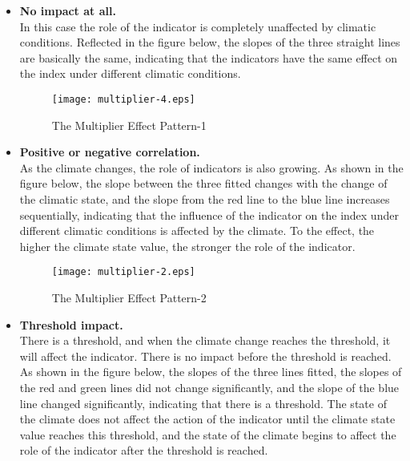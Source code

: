 \documentclass{mcmthesis}
\begin{document}
					\begin{itemize}
						
						\item \textbf{No impact at all.} \\In this case the role of the indicator is completely unaffected by climatic conditions. Reflected in the figure below, the slopes of the three straight lines are basically the same, indicating that the indicators have the same effect on the index under different climatic conditions.
						
						\begin{figure}[h]
							\small
							\centering
							\texttt{[image: multiplier-4.eps]}
							\caption{The Multiplier Effect Pattern-1}
							\label{fig:multiplier-4}
						\end{figure}
						
						\item \textbf{Positive or negative correlation.}\\ As the climate changes, the role of indicators is also growing. As shown in the figure below, the slope between the three fitted changes with the change of the climatic state, and the slope from the red line to the blue line increases sequentially, indicating that the influence of the indicator on the index under different climatic conditions is affected by the climate. To the effect, the higher the climate state value, the stronger the role of the indicator.
						
						\begin{figure}[h]
							\small
							\centering
							\texttt{[image: multiplier-2.eps]}
							\caption{The Multiplier Effect Pattern-2}
							\label{fig:multiplier-2}
						\end{figure}
						
						
						\item \textbf{Threshold impact.}\\ There is a threshold, and when the climate change reaches the threshold, it will affect the indicator. There is no impact before the threshold is reached. As shown in the figure below, the slopes of the three lines fitted, the slopes of the red and green lines did not change significantly, and the slope of the blue line changed significantly, indicating that there is a threshold. The state of the climate does not affect the action of the indicator until the climate state value reaches this threshold, and the state of the climate begins to affect the role of the indicator after the threshold is reached. 
						

\end{itemize}
\end{document}
